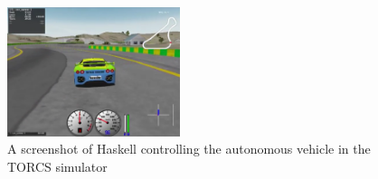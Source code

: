 \begin{figure}[t]
\includegraphics[width=0.45\textwidth]{figs/racing.png}
\caption{A screenshot of Haskell controlling the autonomous vehicle in the TORCS simulator}
\label{fig:race}
\end{figure}
